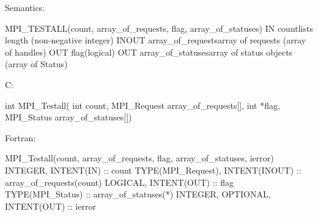 Semantics:

MPI_TESTALL(count, array_of_requests, flag, array_of_statuses)
IN countlists length (non-negative integer)
INOUT array_of_requestsarray of requests (array of handles)
OUT flag(logical)
OUT array_of_statusesarray of status objects (array of Status)

C:

int MPI_Testall(
    int count, MPI_Request array_of_requests[],
    int *flag, MPI_Status array_of_statuses[])

Fortran:

MPI_Testall(count, array_of_requests, flag, array_of_statuses, ierror)
INTEGER, INTENT(IN) :: count
TYPE(MPI_Request), INTENT(INOUT) :: array_of_requests(count)
LOGICAL, INTENT(OUT) :: flag
TYPE(MPI_Status) :: array_of_statuses(*)
INTEGER, OPTIONAL, INTENT(OUT) :: ierror
